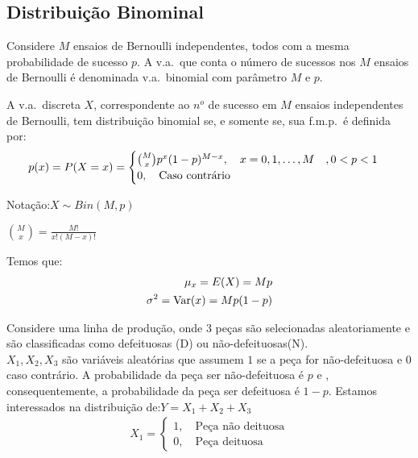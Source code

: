 \subsection{Distribuição Binominal}
 \begin{description}
   \item  Considere $M$ ensaios de Bernoulli independentes, todos com a mesma probabilidade
 de sucesso $p$. A v.a.\ que conta o número de sucessos nos $M$ ensaios de Bernoulli
 é denominada v.a.\ binomial com parâmetro $M$ e $p$.
   \item[Definição:] A v.a.\ discreta $X$, correspondente ao $n^o$ de sucesso em $M$ ensaios
     independentes de Bernoulli, tem distribuição binomial se, e somente se, sua 
     f.m.p.\ é definida por: 
     \begin{align}
       p(x)=P(X=x)=\begin{cases}
         \binom{M}{x}p^x (1-p)^{M-x}, \text{\quad}x=0,1,\dots,M  \quad  ,0<p<1\\
         0, \text{\quad Caso contrário}
       \end{cases}
     \end{align}
   \item{Notação}:$ X \sim Bin(M,p)$
   \begin{obs}
     $\binom{M}{x}=\frac{M!}{x!(M-x)!}$
   \end{obs}
     Temos que: 
     \begin{align}
       \mu_{x}=E(X)=Mp \\
       \sigma^2 =\operatorname{Var}(x)=Mp(1-p)
     \end{align}
     \begin{example}Considere uma linha de produção, onde 3 peças são selecionadas aleatoriamente
     e são classificadas como defeituosas (D) ou não-defeituosas(N).\\
     $X_{1},X_{2},X_{3}$ são variáveis aleatórias que assumem $1$ se a peça for não-defeituosa e $0$ caso 
     contrário. A probabilidade da peça ser não-defeituosa é $p$ e , consequentemente, 
     a probabilidade da peça ser defeituosa é $1-p$. Estamos interessados na distribuição
     de:$Y=X_{1}+X_{2}+X_{3}$
     \begin{align*}
       X_1 = \begin{cases}
         1, \quad \text{Peça não deituosa}\\
         0, \quad \text{Peça deituosa}
       \end{cases}
     \end{align*}
     \begin{figure}[H]

\end{figure}
\end{example}
\end{description}
